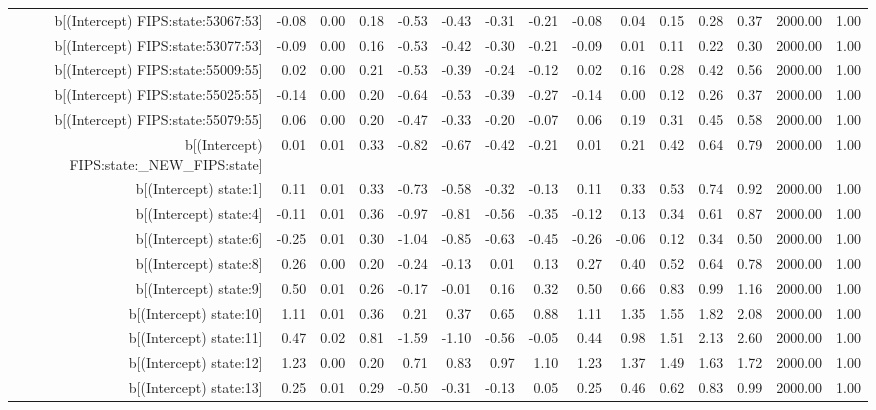 \begin{table}[ht]
\begin{tabular}{rrrrrrrrrrrrrrr}
  b[(Intercept) FIPS:state:53067:53] & -0.08 & 0.00 & 0.18 & -0.53 & -0.43 & -0.31 & -0.21 & -0.08 & 0.04 & 0.15 & 0.28 & 0.37 & 2000.00 & 1.00 \\ 
  b[(Intercept) FIPS:state:53077:53] & -0.09 & 0.00 & 0.16 & -0.53 & -0.42 & -0.30 & -0.21 & -0.09 & 0.01 & 0.11 & 0.22 & 0.30 & 2000.00 & 1.00 \\ 
  b[(Intercept) FIPS:state:55009:55] & 0.02 & 0.00 & 0.21 & -0.53 & -0.39 & -0.24 & -0.12 & 0.02 & 0.16 & 0.28 & 0.42 & 0.56 & 2000.00 & 1.00 \\ 
  b[(Intercept) FIPS:state:55025:55] & -0.14 & 0.00 & 0.20 & -0.64 & -0.53 & -0.39 & -0.27 & -0.14 & 0.00 & 0.12 & 0.26 & 0.37 & 2000.00 & 1.00 \\ 
  b[(Intercept) FIPS:state:55079:55] & 0.06 & 0.00 & 0.20 & -0.47 & -0.33 & -0.20 & -0.07 & 0.06 & 0.19 & 0.31 & 0.45 & 0.58 & 2000.00 & 1.00 \\ 
  b[(Intercept) FIPS:state:\_NEW\_FIPS:state] & 0.01 & 0.01 & 0.33 & -0.82 & -0.67 & -0.42 & -0.21 & 0.01 & 0.21 & 0.42 & 0.64 & 0.79 & 2000.00 & 1.00 \\ 
  b[(Intercept) state:1] & 0.11 & 0.01 & 0.33 & -0.73 & -0.58 & -0.32 & -0.13 & 0.11 & 0.33 & 0.53 & 0.74 & 0.92 & 2000.00 & 1.00 \\ 
  b[(Intercept) state:4] & -0.11 & 0.01 & 0.36 & -0.97 & -0.81 & -0.56 & -0.35 & -0.12 & 0.13 & 0.34 & 0.61 & 0.87 & 2000.00 & 1.00 \\ 
  b[(Intercept) state:6] & -0.25 & 0.01 & 0.30 & -1.04 & -0.85 & -0.63 & -0.45 & -0.26 & -0.06 & 0.12 & 0.34 & 0.50 & 2000.00 & 1.00 \\ 
  b[(Intercept) state:8] & 0.26 & 0.00 & 0.20 & -0.24 & -0.13 & 0.01 & 0.13 & 0.27 & 0.40 & 0.52 & 0.64 & 0.78 & 2000.00 & 1.00 \\ 
  b[(Intercept) state:9] & 0.50 & 0.01 & 0.26 & -0.17 & -0.01 & 0.16 & 0.32 & 0.50 & 0.66 & 0.83 & 0.99 & 1.16 & 2000.00 & 1.00 \\ 
  b[(Intercept) state:10] & 1.11 & 0.01 & 0.36 & 0.21 & 0.37 & 0.65 & 0.88 & 1.11 & 1.35 & 1.55 & 1.82 & 2.08 & 2000.00 & 1.00 \\ 
  b[(Intercept) state:11] & 0.47 & 0.02 & 0.81 & -1.59 & -1.10 & -0.56 & -0.05 & 0.44 & 0.98 & 1.51 & 2.13 & 2.60 & 2000.00 & 1.00 \\ 
  b[(Intercept) state:12] & 1.23 & 0.00 & 0.20 & 0.71 & 0.83 & 0.97 & 1.10 & 1.23 & 1.37 & 1.49 & 1.63 & 1.72 & 2000.00 & 1.00 \\ 
  b[(Intercept) state:13] & 0.25 & 0.01 & 0.29 & -0.50 & -0.31 & -0.13 & 0.05 & 0.25 & 0.46 & 0.62 & 0.83 & 0.99 & 2000.00 & 1.00 \\ 

\end{tabular}
\end{table}
